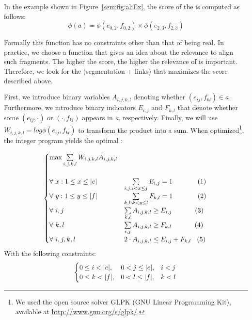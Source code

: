 \documentclass[output=paper,modfonts,nonflat]{langsci/langscibook}
\begin{document}
In the example shown in Figure~\ref{sem:fig:aliEx}, the score of the  is computed as follows:
\begin{equation}
\phi(a)=\phi(e_{0,2},f_{0,2}) \times \phi(e_{2,3},f_{2,3})
\end{equation}

Formally this function has no constraints other than that of being real. 
In practice, we choose a function that gives an idea about the relevance to align such fragments. 
The higher the score, the higher the relevance of  is important. 
Therefore, we look for the  (segmentation + links) that maximizes the score described above.

First, we introduce binary variables $A_{i,j,k,l}$ denoting whether $(e_{ij},f_{kl}) \in a$.
Furthermore, we introduce binary indicators $E_{i,j}$ and $F_{k,l}$ that denote whether some $(e_{ij} ,  \cdotp)$ or $( \cdotp, f_{kl})$ appears in \textit{a}, respectively. 
Finally, we will use $W_{i,j,k,l} = log \phi(e_{ij},f_{kl})$ to transform the product into a sum.
When optimized\footnote{We used the open source solver GLPK (GNU Linear Programming Kit), available at \url{http://www.gnu.org/s/glpk/}.}, the integer program yields the optimal :

\begin{equation}
	\begin{cases}
	    \max \sum\limits_{i,j,k,l}{W_{i,j,k,l}A_{i,j,k,l}}\\
	    \\
	    \forall~x: 1\leq x\leq |e| & \sum\limits_{i,j: i<x\leq j}{E_{i,j}} = 1 \hspace{1.3cm}(1)\\
	    \forall~y: 1\leq y\leq |f| & \sum\limits_{k,l: k<y\leq l}{F_{k,l}} = 1 \hspace{1.3cm}(2)\\
	    \forall~i,j & \sum\limits_{k,l}{A_{i,j,k,l}} \geq E_{i,j} \hspace{1.2cm}(3)\\
	    \forall~k,l & \sum\limits_{i,j}{A_{i,j,k,l}} \geq F_{k,l} \hspace{1.2cm}(4)\\
	    \forall~i,j,k,l & 2\cdot A_{i,j,k,l} \leq E_{i,j}+F_{k,l} \hspace{0.3cm}(5)\\
	\end{cases}\\
\end{equation}
	With the following constraints:
\begin{equation}
	\begin{cases}
	0 \leq i < |e|, & 0 < j \leq |e|, \hspace{0.3cm} i < j\\
	0 \leq k < |f|, & 0 < l \leq |f|, \hspace{0.3cm} k < l\\ 
	\end{cases}\\
\end{equation}
\end{document}
